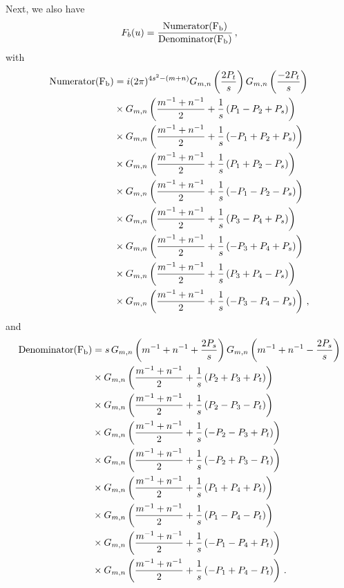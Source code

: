 \documentclass[11pt]{article}
\begin{document}
Next, we also have 
\begin{equation}
    F_b(u)=\frac{\rm Numerator(F_b)}{\rm Denominator(F_b)}\,,
\end{equation}
with
\begin{equation}
\begin{aligned}
    \rm Numerator(F_b)&=i(2\pi)^{4s^2-(m+n)}G_{m,n}\left(\frac{2P_t}{s}\right)G_{m,n}\left(\frac{-2P_t}{s}\right)\\
    &\times G_{m,n}\left(\frac{m^{-1}+n^{-1}}{2}+\frac{1}{s}\left(P_1-P_2+P_s\right)\right)\\
    &\times G_{m,n}\left(\frac{m^{-1}+n^{-1}}{2}+\frac{1}{s}\left(-P_1+P_2+P_s\right)\right)\\
    &\times G_{m,n}\left(\frac{m^{-1}+n^{-1}}{2}+\frac{1}{s}\left(P_1+P_2-P_s\right)\right)\\
    &\times G_{m,n}\left(\frac{m^{-1}+n^{-1}}{2}+\frac{1}{s}\left(-P_1-P_2-P_s\right)\right)\\
    &\times G_{m,n}\left(\frac{m^{-1}+n^{-1}}{2}+\frac{1}{s}\left(P_3-P_4+P_s\right)\right)\\
    &\times G_{m,n}\left(\frac{m^{-1}+n^{-1}}{2}+\frac{1}{s}\left(-P_3+P_4+P_s\right)\right)\\
    &\times G_{m,n}\left(\frac{m^{-1}+n^{-1}}{2}+\frac{1}{s}\left(P_3+P_4-P_s\right)\right)\\
    &\times G_{m,n}\left(\frac{m^{-1}+n^{-1}}{2}+\frac{1}{s}\left(-P_3-P_4-P_s\right)\right)\,,\\
\end{aligned}
\end{equation}
and
\begin{equation}
\begin{aligned}
    \rm Denominator(F_b)&=s\,G_{m,n}\left(m^{-1}+n^{-1}+\frac{2P_s}{s}\right)G_{m,n}\left(m^{-1}+n^{-1}-\frac{2P_s}{s}\right)\\
    &\times G_{m,n}\left(\frac{m^{-1}+n^{-1}}{2}+\frac{1}{s}\left(P_2+P_3+P_t\right)\right)\\
    &\times G_{m,n}\left(\frac{m^{-1}+n^{-1}}{2}+\frac{1}{s}\left(P_2-P_3-P_t\right)\right)\\
    &\times G_{m,n}\left(\frac{m^{-1}+n^{-1}}{2}+\frac{1}{s}\left(-P_2-P_3+P_t\right)\right)\\
    &\times G_{m,n}\left(\frac{m^{-1}+n^{-1}}{2}+\frac{1}{s}\left(-P_2+P_3-P_t\right)\right)\\
    &\times G_{m,n}\left(\frac{m^{-1}+n^{-1}}{2}+\frac{1}{s}\left(P_1+P_4+P_t\right)\right)\\
    &\times G_{m,n}\left(\frac{m^{-1}+n^{-1}}{2}+\frac{1}{s}\left(P_1-P_4-P_t\right)\right)\\
    &\times G_{m,n}\left(\frac{m^{-1}+n^{-1}}{2}+\frac{1}{s}\left(-P_1-P_4+P_t\right)\right)\\
    &\times G_{m,n}\left(\frac{m^{-1}+n^{-1}}{2}+\frac{1}{s}\left(-P_1+P_4-P_t\right)\right)\,.\\
\end{aligned}
\end{equation}
\end{document}
